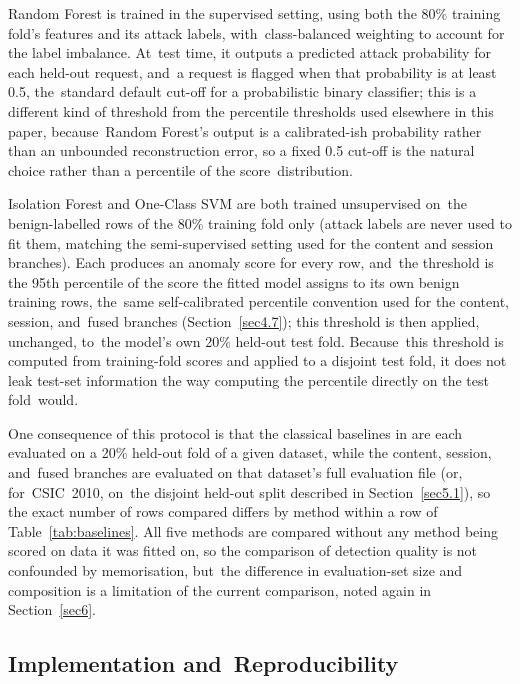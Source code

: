 \documentclass[futureinternet,article,accept,moreauthors]{Definitions/mdpi}
\begin{document}
Random Forest is trained in the supervised setting, using both the 80\% training fold's features and its attack labels, with~class-balanced weighting to account for the label imbalance. At~test time, it outputs a predicted attack probability for each held-out request, and~a request is flagged when that probability is at least 0.5, the~standard default cut-off for a probabilistic binary classifier; this is a different kind of threshold from the percentile thresholds used elsewhere in this paper, because~Random Forest's output is a calibrated-ish probability rather than an unbounded reconstruction error, so a fixed 0.5 cut-off is the natural choice rather than a percentile of the score~distribution.

Isolation Forest and One-Class SVM are both trained unsupervised on~the benign-labelled rows of the 80\% training fold only (attack labels are never used to fit them, matching the semi-supervised setting used for the content and session branches). Each produces an anomaly score for every row, and~the threshold is the 95th percentile of the score the fitted model assigns to its own benign training rows, the~same self-calibrated percentile convention used for the content, session, and~fused branches (Section~\ref{sec4.7}); this threshold is then applied, unchanged, to~the model's own 20\% held-out test fold. Because~this threshold is computed from training-fold scores and applied to a disjoint test fold, it does not leak test-set information the way computing the percentile directly on the test fold~would.

One consequence of this protocol is that the classical baselines in  %
 are each evaluated on a 20\% held-out fold of a given dataset, while the content, session, and~fused branches are evaluated on that dataset's full evaluation file (or, for~CSIC~2010, on~the disjoint held-out split described in Section~\ref{sec5.1}), so the exact number of rows compared differs by method within a row of Table~\ref{tab:baselines}. All five methods are compared without any method being scored on data it was fitted on, so the comparison of detection quality is not confounded by memorisation, but~the difference in evaluation-set size and composition is a limitation of the current comparison, noted again in Section~\ref{sec6}.

\subsection{Implementation and~Reproducibility}
\end{document}
